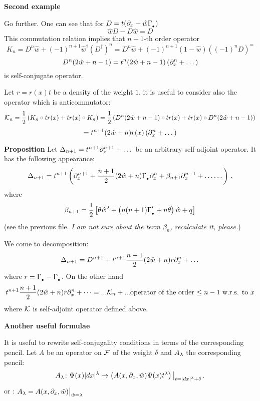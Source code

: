      {\bf Second example}

     Go further. One can see that for $D=t(\partial_x+\hat w\Gamma_{_{\bullet}})$
             $$
             \hat wD-D\hat w=D
             $$
     This commutation relation implies that $n+1$-th order operator
            $$
         K_{n}=
         D^n\hat w+(-1)^{n+1}\hat w^\dagger
         \left(D^\dagger\right)^n=
         D^n\hat w+(-1)^{n+1}(1-\hat w)
         \left((-1)^nD\right)^=
            $$
            $$
         D^n(2\hat w+n-1)=t^n(2\hat w+n-1)\left(\partial_x^n+\dots\right)
            $$
     is self-conjugate operator.

     Let $r=r(x)t$ be a density of the weight $1$. it is useful to consider also the  operator
     which is anticommutator:
          $$
       {\cal K}_{n}={1\over 2}\left(K_n\circ tr(x)+tr(x)\circ K_n \right)=
            {1\over 2}\left(D^n(2\hat w+n-1)\circ tr(x)+tr(x)\circ D^n(2\hat w+n-1) \right)
        $$
        $$
       =t^{n+1}(2\hat w+n)r(x)\left(\partial_x^n+\dots\right)
          $$

{\bf Proposition }           Let $\Delta_{n+1}=t^{n+1}\partial_x^{n+1}+\dots$ be an arbitrary
self-adjoint operator. It has the following
appearance:
                        $$
                    \Delta_{n+1}=t^{n+1}
                    \left(
                   \partial_x^{n+1}
        +{n+1\over 2}
        (2\hat w+n)\Gamma_{_{\bullet}}\partial_x^{n}
                      +
                 \beta_{n+1}\partial_x^{n-1}+\dots
            \dots
            \right)\,,
                        $$
                        where
                        $$
                     \beta_{n+1}={1\over 2}\left[
               \theta\hat w^2+\left(n(n+1)\Gamma_{_{\bullet}}^\prime+n\theta\right) \hat w+q
               \right]
                        $$
(see the previous file. {\it I am not sure about the term $\beta_n$, recalculate it, please.})

We come to decomposition:
            $$
 \Delta_{n+1}=D^{n+1}+t^{n+1}{n+1\over 2}(2\hat w+n)r\partial_x^n+\dots
            $$
           where $r=\Gamma_{_{\bullet}}-\Gamma_{_{\bullet}}$.  On the other hand
                   $$
   t^{n+1}{n+1\over 2}(2\hat w+n)r\partial_x^n+\dots=...{\cal K}_n+...\hbox{operator of the order $\leq n-1$ w.r.s. to $x$}
                   $$
where $\cal K$ is self-adjoint operator defined above.

\bigskip

     \centerline {\bf Another useful formulae}

  It is useful to rewrite self-conjugality conditions in terms of the corresponding pencil.
  Let $A$ be an operator on $\cal F$ of the weight $\delta$ and $A_\lambda$ the corresponding pencil:
             $$
         A_\lambda\colon \Psi(x)|dx|^\lambda\mapsto \left(A(x,\partial_x,\hat w)\Psi(x)t^\lambda\right)\big\vert_{t=|dx|^\lambda+\delta}\,.     
             $$ 
           or : $A_\lambda=A(x,\partial_x,\hat w)\big\vert_{\hat w=\lambda}$
           
